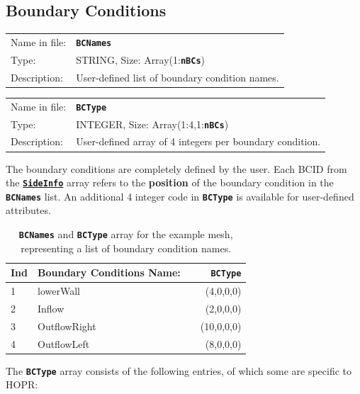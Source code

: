 \documentclass[a4paper,headsepline]{scrreprt}
\newcommand\ttbf[1]{\texttt{\textbf{#1}}}
\newcommand\SideInfo{\hyperlink{SideInfo}{\ttbf{SideInfo}}\xspace}
\newcommand\BCNames{\ttbf{BCNames}\xspace}
\newcommand\BCType{\ttbf{BCType}\xspace}
\newcommand\nBCs{\ttbf{nBCs}\xspace}
\begin{document}
\newpage

\subsection{Boundary Conditions}
\label{sec:BC}

\begin{tabularx}{1.0\textwidth}{lX}
Name in file: & \BCNames \\
Type:         & STRING, \quad Size: Array(1:\nBCs)  \\
Description:  & User-defined list of boundary condition names. \\
\end{tabularx}

\begin{tabularx}{1.0\textwidth}{lX}
Name in file: & \BCType \\
Type:         & INTEGER, \quad Size: Array(1:4,1:\nBCs)  \\
Description:  & User-defined array of 4 integers per boundary condition. \\
\end{tabularx}

The boundary conditions are completely defined by the user. Each BCID from the \SideInfo array refers to the \textbf{position} of the boundary condition in the \BCNames list. An additional 4 integer code in \BCType is available for user-defined attributes.

\begin{table}[h!]
\centering
\begin{tabular}{|l|l|c|r|} \hline
Ind & Boundary Conditions Name: & & \BCType    \\ \hline
1   &  lowerWall                & & (4,0,0,0)  \\
2   &  Inflow                   & & (2,0,0,0)  \\
3   &  OutflowRight             & & (10,0,0,0) \\
4   &  OutflowLeft              & & (8,0,0,0)  \\ \hline
\end{tabular}
\caption{\BCNames and \BCType array for the example mesh, representing a list of boundary condition names.}
\end{table}


\smallskip
The \BCType array consists of the following entries, of which some are specific to HOPR:
\end{document}
